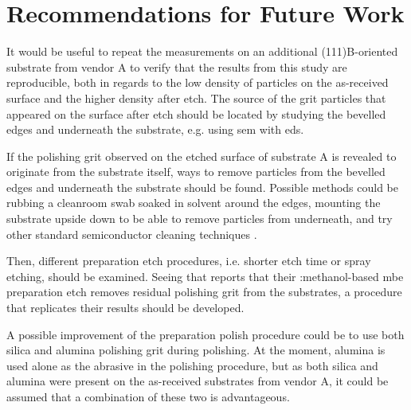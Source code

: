 \chapter{Recommendations for Future Work}\label{ch:further-work}
%

It would be useful to repeat the measurements on an additional (111)B-oriented substrate from vendor A to verify that the results from this study are reproducible, both in regards to the low density of particles on the as-received surface and the higher density after etch. The source of the grit particles that appeared on the surface after etch should be located by studying the bevelled edges and underneath the substrate, e.g. using \ac{sem} with \ac{eds}.

If the polishing grit observed on the etched surface of substrate A is revealed to originate from the substrate itself, ways to remove particles from the bevelled edges and underneath the substrate should be found. Possible methods could be rubbing a cleanroom swab soaked in solvent around the edges, mounting the substrate upside down to be able to remove particles from underneath, and try other standard semiconductor cleaning techniques \citep{reinhardt2008handbook}.

Then, different preparation etch procedures, i.e. shorter etch time or spray etching, should be examined. Seeing that \citet{benson2016analysis} reports that their :methanol-based \ac{mbe} preparation etch removes residual  polishing grit from the substrates, a procedure that replicates their results should be developed.

A possible improvement of the preparation polish procedure could be to use both silica and alumina polishing grit during polishing. At the moment, alumina is used alone as the abrasive in the polishing procedure, but as both silica and alumina were present on the as-received substrates from vendor A, it could be assumed that a combination of these two is advantageous.

